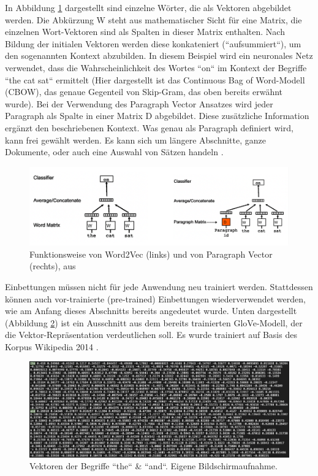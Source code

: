 In Abbildung \ref{Abbildung:mikolov} dargestellt sind einzelne Wörter, die als Vektoren abgebildet werden. Die Abkürzung W steht aus mathematischer Sicht für eine Matrix, die einzelnen Wort-Vektoren sind als Spalten in dieser Matrix enthalten. Nach Bildung der initialen Vektoren werden diese konkateniert (``aufsummiert``), um den sogenannten Kontext abzubilden. In diesem Beispiel wird ein neuronales Netz verwendet, dass die Wahrscheinlichkeit des Wortes ``on`` im Kontext der Begriffe ``the cat sat`` ermittelt (Hier dargestellt ist das Continuous Bag of Word-Modell (CBOW), das genaue Gegenteil von Skip-Gram, das oben bereits erwähnt wurde). Bei der Verwendung des Paragraph Vector Ansatzes wird jeder Paragraph als Spalte in einer Matrix D abgebildet. Diese zusätzliche Information ergänzt den beschriebenen Kontext. Was genau als Paragraph definiert wird, kann frei gewählt werden. Es kann sich um längere Abschnitte, ganze Dokumente, oder auch eine Auswahl von Sätzen handeln \cite{mikolov2014}.
 
\begin{figure}[h]
\centering
\includegraphics[scale=0.9]{content/pics/Picture_5.png}
\caption{Funktionsweise von Word2Vec (links) und von Paragraph Vector (rechts), aus \cite{mikolov2014}}
\label{Abbildung:mikolov}
\end{figure}

Einbettungen müssen nicht für jede Anwendung neu trainiert werden. Stattdessen können auch vor-trainierte (pre-trained) Einbettungen wiederverwendet werden, wie am Anfang dieses Abschnitts bereits angedeutet wurde. Unten dargestellt (Abbildung \ref{Abbildung:word_vecs}) ist ein Ausschnitt aus dem bereits trainierten GloVe-Modell, der die Vektor-Repräsentation verdeutlichen soll. Es wurde trainiert auf Basis des Korpus Wikipedia 2014 \cite{stanford}.

\begin{figure}[h]
\centering
\includegraphics[scale=0.9]{content/pics/Picture_6.png}
\caption{Vektoren der Begriffe ``the`` \& ``and``. Eigene Bildschirmaufnahme.}
\label{Abbildung:word_vecs}
\end{figure}
 
